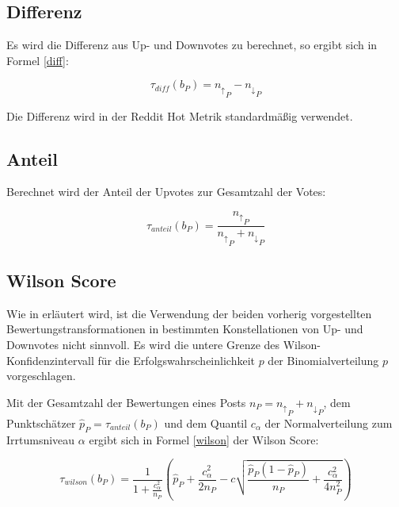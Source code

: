 \subsection{Differenz}

Es wird die Differenz aus Up- und Downvotes zu berechnet, so ergibt sich in Formel \ref{diff}:

\begin{equation}
\label{diff}
\tau_{diff}(b_P) = {n_\uparrow}_P - {n_\downarrow}_P
\end{equation}

Die Differenz wird in der Reddit Hot Metrik standardmäßig verwendet.

\subsection{Anteil}

Berechnet wird der Anteil der Upvotes zur Gesamtzahl der Votes:

\begin{equation}
\label{anteil}
\tau_{anteil}(b_P) = \frac{{n_\uparrow}_P}{{n_\uparrow}_P + {n_\downarrow}_P}
\end{equation}


\subsection{Wilson Score}

Wie in \cite{miller} erläutert wird, ist die Verwendung der beiden vorherig vorgestellten Bewertungstransformationen in bestimmten Konstellationen von Up- und Downvotes nicht sinnvoll. Es wird  die untere Grenze des Wilson-Konfidenzintervall für die Erfolgswahrscheinlichkeit $p$ der Binomialverteilung $p$ vorgeschlagen.%
	
Mit der Gesamtzahl der Bewertungen eines Posts $n_P = {n_\uparrow}_P + {n_\downarrow}_P$, dem Punktschätzer $\hat{p}_P = \tau_{anteil}(b_P)$ und dem Quantil $c_{\alpha}$ der Normalverteilung zum Irrtumsniveau $\alpha$ ergibt sich in Formel \ref{wilson} der Wilson Score:

\begin{equation}
\label{wilson}
 \tau_{wilson}(b_P) = \frac{1}{1+\frac{c_{\alpha}^2}{n_P}}(\hat{p}_P + \frac{c_{\alpha}^2}{2n_P} - c \sqrt{\frac{\hat{p}_P(1 - \hat{p}_P)}{n_P} + \frac{c_{\alpha}^2}{4n_P^2}})
\end{equation}
	
